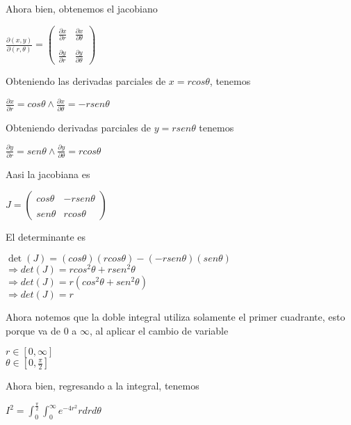 Ahora bien, obtenemos el jacobiano\begin{center}
    $\displaystyle\frac{\partial\left ( x,y \right )}{\partial\left ( r,\theta \right )} = \begin{pmatrix}
        \displaystyle\frac{\partial x}{\partial r} & \displaystyle\frac{\partial x}{\partial \theta} \\\\
        \displaystyle\frac{\partial y}{\partial r} & \displaystyle\frac{\partial y}{\partial \theta}
    \end{pmatrix}$
\end{center}Obteniendo las derivadas parciales de $x = rcos\theta$, tenemos\begin{center}
    $\displaystyle\frac{\partial x}{\partial r} = cos\theta \wedge \displaystyle\frac{\partial x}{\partial \theta} = -rsen\theta$
\end{center}Obteniendo derivadas parciales de $y = rsen\theta$ tenemos\begin{center}
    $\displaystyle\frac{\partial y}{\partial r} = sen\theta \wedge \displaystyle\frac{\partial y}{\partial \theta} = rcos\theta$
\end{center}Aasi la jacobiana es\begin{center}
    $J = \begin{pmatrix}
        \displaystyle cos\theta & \displaystyle -rsen\theta \\\\
        \displaystyle sen\theta & \displaystyle rcos\theta 
    \end{pmatrix}$
\end{center}El determinante es\begin{center}
    $\displaystyle\det(J) = \left ( cos\theta \right )\left ( rcos\theta \right ) - \left ( -rsen\theta \right )\left ( sen\theta \right )$\\
    \vspace{0.3cm}
    $\Rightarrow det(J) = rcos^2\theta + rsen^2\theta$\\
    \vspace{0.3cm}
    $\Rightarrow det(J) = r\left ( cos^2\theta + sen^2\theta \right )$\\
    \vspace{0.3cm}
    $\Rightarrow det(J) = r$
\end{center}
Ahora notemos que la doble integral utiliza solamente el primer cuadrante, esto porque va de $0$ a $\infty$, al aplicar el cambio de variable\begin{center}
    $r\in \left [ 0,\infty \right ]$\\
    \vspace{0.3cm}
    $\displaystyle\theta\in\left [ 0,\frac{\pi}{2} \right ] $
\end{center}Ahora bien, regresando a la integral, tenemos\begin{center}
    $I^2 = \displaystyle\int_{0}^{\frac{\pi}{2}} \displaystyle\int_{0}^{\infty} e^{-4r^2} rdrd\theta$
\end{center}
